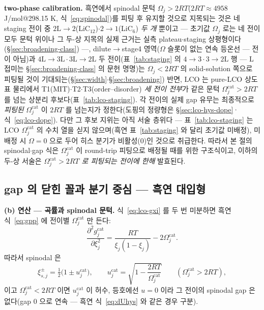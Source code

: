 \textbf{two-phase calibration.}
흑연에서 spinodal 문턱 $\Omega_j>2RT$($2RT\approx4958$ J/mol@298.15 K, 식~\eqref{eq:spinodal})를 피팅 후
유지할 것으로 지목되는 것은 네 staging 전이 중 $2\mathrm L\!\to\!2$(LiC$_{12}$)$\cdot$$2\!\to\!1$(LiC$_6$)
\emph{두 개} 뿐이고 --- 초기값 $\Omega_j$ 로는 네 전이 모두 문턱 위이나 그 두-상 지목의 실제 근거는 실측
plateau$\cdot$staging 상평형이다(\S\ref{sec:broadening-class}) ---, dilute$\to$stage4 영역($\Omega$ 슬롯이
없는 연속 등온선 --- 전이 아님)과 $4\mathrm L\!\to\!3\mathrm L\cdot3\mathrm L\!\to\!2\mathrm L$ 두 전이(표~\ref{tab:staging}
의 $4\!\to\!3\cdot3\!\to\!2\mathrm L$ 행 --- L 접미는 \S\ref{sec:broadening-class} 의 문헌 명명)는 $\Omega_j<2RT$ 의
solid-solution 쪽으로 피팅될 것이 기대되는(\S\ref{sec:width}$\cdot$\S\ref{sec:broadening}) 반면, LCO 는 pure-LCO
상도표 물리에서 T1(MIT)$\cdot$T2$\cdot$T3(order--disorder) \emph{세 전이 전부}가 같은 문턱
$\Omega_j^\mathrm{cat}>2RT$ 를 넘는 상분리 후보다\cite{reimers1992,vanderven1998,motohashi2009}(표~\ref{tab:lco-staging}). 각 전이의 실제 gap 유무는 최종적으로
\emph{피팅된} $\Omega_j^\mathrm{cat}$ 이 $2RT$ 를 넘는지가 정한다(도핑의 정량형은 \S\ref{sec:lco-hys-dope}·식~\eqref{eq:lco-dope}). 다만 그 후보 지위는 아직 서술
층위다 --- 표~\ref{tab:lco-staging} 는 LCO $\Omega_j^\mathrm{cat}$ 의 수치 열을 싣지 않으며(흑연
표~\ref{tab:staging} 와 달리 초기값 미배정), 미배정 시 $\Omega=0$ 으로 두어 히스 분기가 비활성(0)인
것으로 취급한다. 따라서 본 절의 spinodal$\cdot$gap 식은 $\Omega_j^\mathrm{cat}$
이 round-trip 피팅으로 배정될 때를 위한 구조식이고, 이하의 두-상 서술은 \emph{$\Omega_j^\mathrm{cat}>2RT$
로 피팅되는 전이에 한해} 발효된다.

\subsection{gap 의 닫힌 꼴과 분기 중심 --- 흑연 대입형}\label{sec:lco-hys-gap}
\textbf{(b) 연산 --- 곡률과 spinodal 문턱.}
식~\eqref{eq:lco-gxi} 를 두 번 미분하면 흑연 식~\eqref{eq:gpp} 에 전이별 $\Omega_j^\mathrm{cat}$ 만 든다:
\begin{equation}
\frac{\partial^2 g_j^\mathrm{cat}}{\partial\xi_j^2}=\frac{RT}{\xi_j(1-\xi_j)}-2\Omega_j^\mathrm{cat}.
\label{eq:lco-gpp}
\end{equation}
따라서 spinodal 은
\begin{equation}
\xi_{s,j}^{\pm}=\tfrac12\big(1\pm u_j^\mathrm{cat}\big),\qquad
u_j^\mathrm{cat}=\sqrt{1-\frac{2RT}{\Omega_j^\mathrm{cat}}}\qquad(\Omega_j^\mathrm{cat}>2RT),
\label{eq:lco-spinodal}
\end{equation}
이고 $\Omega_j^\mathrm{cat}<2RT$ 이면 $u_j^\mathrm{cat}$ 이 허수, 등호에선 $u=0$ 이라 그 전이의 spinodal gap 은 없다(gap $0$ 으로 연속 ---
흑연 식~\eqref{eq:dUhys} 와 같은 경우 구분).

